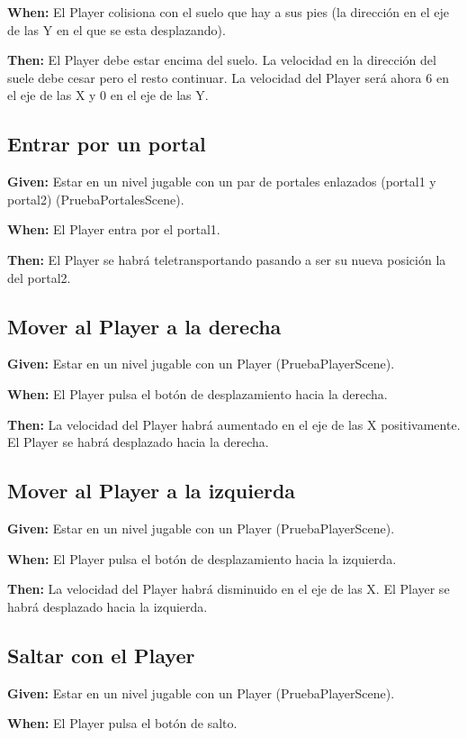 \textbf{When:} El Player colisiona con el suelo que hay a sus pies (la dirección en el eje de las Y en el que se esta desplazando).

\textbf{Then:} El Player debe estar encima del suelo. La velocidad en la dirección del suele debe cesar pero el resto continuar. La velocidad del Player será ahora 6 en el eje de las X y 0 en el eje de las Y.

\subsection{Entrar por un portal}
\textbf{Given:} Estar en un nivel jugable con un par de portales enlazados (portal1 y portal2) (PruebaPortalesScene).

\textbf{When:} El Player entra por el portal1.

\textbf{Then:} El Player se habrá teletransportando pasando a ser su nueva posición la del portal2.

\subsection{Mover al Player a la derecha}
\textbf{Given:} Estar en un nivel jugable con un Player (PruebaPlayerScene).

\textbf{When:} El Player pulsa el botón de desplazamiento hacia la derecha.

\textbf{Then:} La velocidad del Player habrá aumentado en el eje de las X positivamente. El Player se habrá desplazado hacia la derecha.

\subsection{Mover al Player a la izquierda}
\textbf{Given:} Estar en un nivel jugable con un Player (PruebaPlayerScene).

\textbf{When:} El Player pulsa el botón de desplazamiento hacia la izquierda.

\textbf{Then:} La velocidad del Player habrá disminuido en el eje de las X. El Player se habrá desplazado hacia la izquierda.

\subsection{Saltar con el Player}
\textbf{Given:} Estar en un nivel jugable con un Player (PruebaPlayerScene).

\textbf{When:} El Player pulsa el botón de salto.

